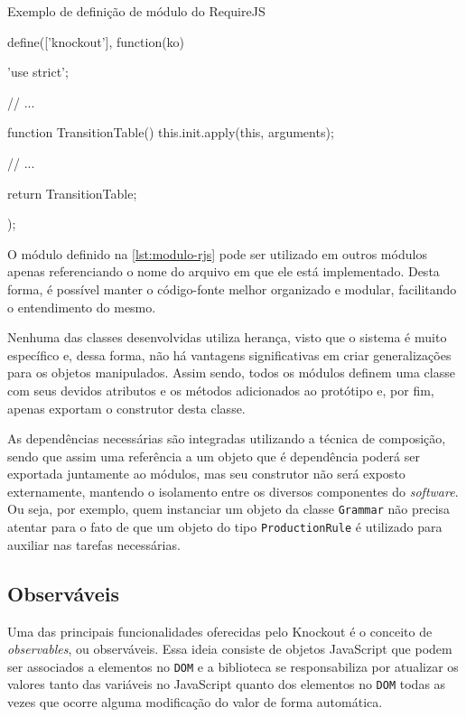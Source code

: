 \documentclass[12pt]{article}
\newenvironment{code}{\captionsetup{type=listing}}{}
\begin{document}
\begin{code}
  \caption{Exemplo de definição de módulo do RequireJS}
  \label{lst:modulo-rjs}
  \begin{jscode}
define(['knockout'], function(ko) {
    'use strict';

    // ...

    function TransitionTable() {
        this.init.apply(this, arguments);
    }

    // ...

    return TransitionTable;
});
  \end{jscode}
\end{code}

O módulo definido na \autoref{lst:modulo-rjs} pode ser utilizado em outros módulos apenas referenciando o nome do
arquivo em que ele está implementado. Desta forma, é possível manter o código-fonte melhor organizado e modular,
facilitando o entendimento do mesmo.

Nenhuma das classes desenvolvidas utiliza herança, visto que o sistema é muito específico e, dessa forma, não há
vantagens significativas em criar generalizações para os objetos manipulados. Assim sendo, todos os módulos definem
uma classe com seus devidos atributos e os métodos adicionados ao protótipo e, por fim, apenas exportam o construtor
desta classe.

As dependências necessárias são integradas utilizando a técnica de composição, sendo que assim uma referência a um
objeto que é dependência poderá ser exportada juntamente ao módulos, mas seu construtor não será exposto externamente,
mantendo o isolamento entre os diversos componentes do \textit{software}. Ou seja, por exemplo, quem instanciar um
objeto da classe \texttt{Grammar} não precisa atentar para o fato de que um objeto do tipo \texttt{ProductionRule} é
utilizado para auxiliar nas tarefas necessárias.

\subsection{Observáveis}

Uma das principais funcionalidades oferecidas pelo Knockout \cite{knockout} é o conceito de \textit{observables}, ou
observáveis. Essa ideia consiste de objetos JavaScript que podem ser associados a elementos no \texttt{DOM} e a
biblioteca se responsabiliza por atualizar os valores tanto das variáveis no JavaScript quanto dos elementos no
\texttt{DOM} todas as vezes que ocorre alguma modificação do valor de forma automática.
\end{document}
